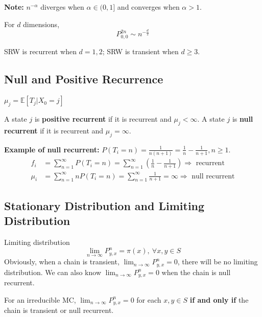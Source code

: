 \documentclass[11pt]{elegantbook}
\begin{document}
\textbf{Note:} $n^{-\alpha}$ diverges when $\alpha\in (0,1]$ and converges when $\alpha>1$.

For $d$ dimensions, $$P_{0,0}^{2n}\sim n^{-\frac{d}{2}}$$

\begin{lemma}
    SRW is recurrent when $d=1,2$; SRW is transient when $d\geq 3$.
\end{lemma}



\subsection{Null and Positive Recurrence}
$\mu_j= \mathbb{E}[T_j|X_0=j]$
\begin{definition}
    A state $j$ is \textbf{positive recurrent} if it is recurrent and $\mu_j<\infty$. A state $j$ is \textbf{null recurrent} if it is recurrent and $\mu_j=\infty$.
\end{definition}
\textbf{Example of null recurrent:} $P(T_i=n)=\frac{1}{n(n+1)}=\frac{1}{n}-\frac{1}{n+1},n\geq 1$.
\begin{equation}
    \begin{aligned}
        f_i&=\sum_{n=1}^\infty P(T_i=n)=\sum_{n=1}^\infty\left(\frac{1}{n}-\frac{1}{n+1}\right)\Rightarrow \text{ recurrent}\\
        \mu_i&=\sum_{n=1}^\infty nP(T_i=n)=\sum_{n=1}^\infty\frac{1}{n+1}=\infty\Rightarrow \text{ null recurrent}
    \end{aligned}
    \nonumber
\end{equation}

\subsection{Stationary Distribution and Limiting Distribution}
Limiting distribution $$\lim_{n \rightarrow \infty}P^{n}_{y,x}=\pi(x),\ \forall x,y\in S$$
Obviously, when a chain is transient, $\lim_{n \rightarrow \infty}P^{n}_{y,x}=0$, there will be no limiting distribution. We can also know $\lim_{n \rightarrow \infty}P^{n}_{y,x}=0$ when the chain is null recurrent.

\begin{lemma}
    For an irreducible MC, $\lim_{n \rightarrow \infty}P^{n}_{y,x}=0$ for each $x,y\in S$ \textbf{if and only if} the chain is transient or null recurrent.
\end{lemma}
\end{document}

